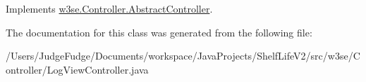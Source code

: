 Implements \hyperlink{classw3se_1_1_controller_1_1_abstract_controller_a92ee594be5083c2db0eb40286190595e}{w3se.\-Controller.\-Abstract\-Controller}.



The documentation for this class was generated from the following file\-:\begin{DoxyCompactItemize}
\item 
/\-Users/\-Judge\-Fudge/\-Documents/workspace/\-Java\-Projects/\-Shelf\-Life\-V2/src/w3se/\-Controller/Log\-View\-Controller.\-java\end{DoxyCompactItemize}
